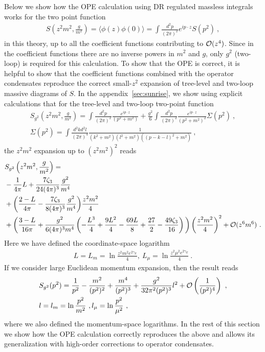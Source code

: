 \documentclass[a4paper,11pt]{article}
\begin{document}
Below we show how the OPE calculation using DR regulated massless integrals works for the two point function 
\begin{align} \label{eq:defS}
S\left(z^2m^2,\frac{g}{m^2}\right)=\langle \phi(z)\phi(0) \rangle=\int \frac{d^2p}{(2\pi)^2}e^{ip\cdot z}S\left(p^2\right) \ ,
\end{align}
in this theory, up to all the coefficient functions contributing to ${\cal O}(z^4)$. Since in the coefficient functions there are no inverse powers in $m^2$ and $g$, only $g^2$ (two-loop) is required for this calculation. To show that the OPE is correct, it is helpful to show that the coefficient functions combined with the operator condensates reproduce the correct small-$z^2$ expansion of tree-level and two-loop massive diagrams of $S$. In the appendix~\ref{sec:sunrise}, we show using explicit calculations that for the tree-level and two-loop two-point function
\begin{align}
S_{g^2}\left(z^2m^2,\frac{g}{m^2}\right)=\int \frac{d^2p}{(2\pi)^2}\frac{e^{ip\cdot z}}{(p^2+m^2)}+\frac{g^2}{6}\int \frac{d^2p}{(2\pi)^2}\frac{e^{ip\cdot z}}{(p^2+m^2)^2}\Sigma(p^2) \ , \\
\Sigma(p^2)=\int \frac{d^2k d^2l}{(2\pi)^4}\frac{1}{(k^2+m^2)(l^2+m^2)((p-k-l)^2+m^2)} \ , \label{eq:defsigma}
\end{align}
the $z^2m^2$ expansion up to $(z^2m^2)^2$ reads
\begin{align}\label{eq:fullexpansion1}
&S_{g^2}\left(z^2m^2,\frac{g}{m^2}\right)=\nonumber \\&-\frac{1}{4\pi}L+\frac{7\zeta_3}{24(4\pi)^3}\frac{g^2}{m^4}\nonumber \\
& +\bigg(\frac{2-L}{4\pi}-\frac{7\zeta_3}{8(4\pi)^3}\frac{g^2}{m^4}\bigg)\frac{z^2m^2}{4} \nonumber \\ 
&+ \bigg(\frac{3-L}{16\pi}+\frac{g^2}{6(4\pi)^3m^4}\left(-\frac{L^3}{4}+\frac{9L^2}{4}-\frac{69L}{8}+\frac{27}{2}-\frac{49\zeta_3}{16}\right)\bigg)\left(\frac{z^2m^2}{4}\right)^2+{\cal O}(z^6m^6) \ .
\end{align}
Here we have defined the coordinate-space logarithm
\begin{align}
L=L_{m}=\ln \frac{z^2m^2e^{2\gamma_E}}{4}, \ L_{\mu}=\ln \frac{z^2\mu^2e^{2\gamma_E}}{4} \ .
\end{align}
If we consider large Euclidean momentum expansion, then the result reads
\begin{align}
& S_{g^2}(p^2)=\frac{1}{p^2}-\frac{m^2}{(p^2)^2}+\frac{m^4}{(p^2)^3}+\frac{g^2}{32\pi^2(p^2)^3}l^2 +{\cal O}\left(\frac{1}{(p^2)^4}\right)\ , \\
& l=l_{m}=\ln \frac{p^2}{m^2} \ , l_{\mu}=\ln \frac{p^2}{\mu^2} \  ,
\end{align}
where we also defined the momentum-space logarithms. In the rest of this section we show how the OPE calculation correctly reproduces the above and allows its generalization with high-order corrections to operator condensates.
\end{document}
